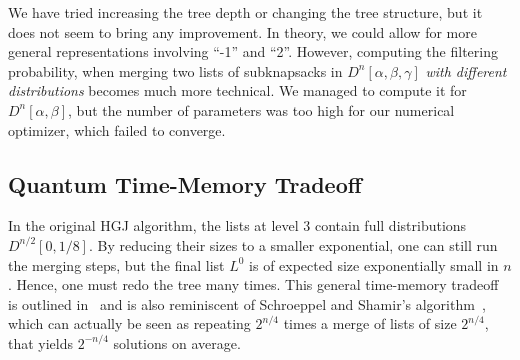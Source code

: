
\begin{remark}
We have tried increasing the tree depth or changing the tree structure, but it does not seem to bring any improvement. In theory, we could allow for more general representations involving ``-1'' and ``2''. However, computing the filtering probability, when merging two lists of subknapsacks in $D^n[\alpha, \beta, \gamma]$ \emph{with different distributions} becomes much more technical. We managed to compute it for $D^n[\alpha, \beta]$, but the number of parameters was too high for our numerical optimizer, which failed to converge.
\end{remark}


\subsection{Quantum Time-Memory Tradeoff}

In the original HGJ algorithm, the lists at level 3 contain full distributions $D^{n/2}[0, 1/8]$. By reducing their sizes to a smaller exponential, one can still run the merging steps, but the final list $L^0$ is of expected size exponentially small in $n$. Hence, one must redo the tree many times.
This general time-memory tradeoff is outlined in~\cite{DBLP:conf/eurocrypt/Howgrave-GrahamJ10} and is also reminiscent of Schroeppel and Shamir's algorithm~\cite{DBLP:journals/siamcomp/SchroeppelS81}, which can actually be seen as repeating $2^{n/4}$ times a merge of lists of size $2^{n/4}$, that yields $2^{-n/4}$ solutions on average. %




